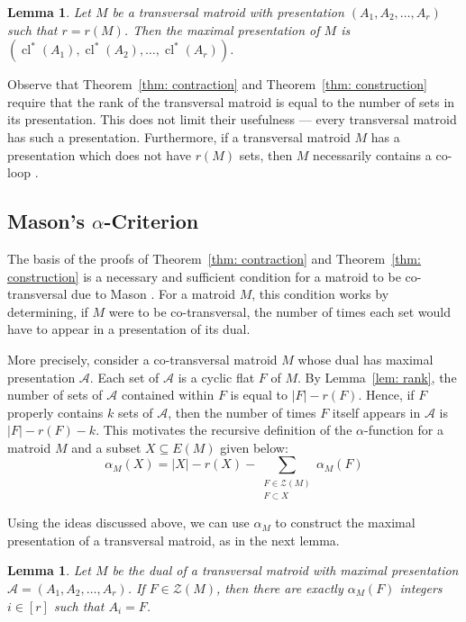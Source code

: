 \documentclass[11pt, reqno]{amsart}
\newtheorem{lemma}[theorem]{Lemma}
\DeclareMathOperator{\cl}{cl}
\begin{document}
\begin{lemma} \label{lem: closure is maximal}
Let $M$ be a transversal matroid with presentation $(A_1, A_2, \ldots, A_r)$ such that $r = r(M)$. Then the maximal presentation of $M$ is $(\cl^*(A_1), \cl^*(A_2), \ldots, \cl^*(A_r))$.
\end{lemma}

Observe that Theorem~\ref{thm: contraction} and Theorem~\ref{thm: construction} require that the rank of the transversal matroid is equal to the number of sets in its presentation. This does not limit their usefulness --- every transversal matroid has such a presentation. Furthermore, if a transversal matroid $M$ has a presentation which does not have $r(M)$ sets, then $M$ necessarily contains a co-loop \cite[Lemma 2.3]{bon15}.

\subsection{Mason's $\alpha$-Criterion}
The basis of the proofs of Theorem~\ref{thm: contraction} and Theorem~\ref{thm: construction} is a necessary and sufficient condition for a matroid to be co-transversal due to Mason \cite{mas72}. For a matroid $M$, this condition works by determining, if $M$ were to be co-transversal, the number of times each set would have to appear in a presentation of its dual.

More precisely, consider a co-transversal matroid $M$ whose dual has maximal presentation $\mathcal A$. Each set of $\mathcal A$ is a cyclic flat $F$ of $M$. By Lemma~\ref{lem: rank}, the number of sets of $\mathcal A$ contained within $F$ is equal to $|F| - r(F)$. Hence, if $F$ properly contains $k$ sets of $\mathcal A$, then the number of times $F$ itself appears in $\mathcal A$ is $|F| - r(F) - k$. This motivates the recursive definition of the $\alpha$-function for a matroid $M$ and a subset $X \subseteq E(M)$ given below:
$$
\alpha_M(X) = |X| - r(X) - \sum_{\substack{F \in \mathcal Z(M) \\ F \subset X}} \alpha_M(F)
$$

Using the ideas discussed above, we can use $\alpha_M$ to construct the maximal presentation of a transversal matroid, as in the next lemma.

\begin{lemma} \label{lem: alpha_construction}
Let $M$ be the dual of a transversal matroid with maximal presentation $\mathcal A = (A_1, A_2, \ldots, A_r)$. If $F \in \mathcal Z(M)$, then there are exactly $\alpha_M(F)$ integers $i \in [r]$ such that $A_i = F$.
\end{lemma}
\end{document}
